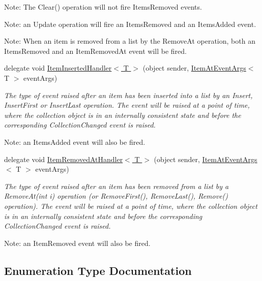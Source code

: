 \begin{DoxyCompactItemize}
\begin{DoxyCompactList}
Note\+: The Clear() operation will not fire Items\+Removed events. 

Note\+: an Update operation will fire an Items\+Removed and an Items\+Added event. 

Note\+: When an item is removed from a list by the Remove\+At operation, both an Items\+Removed and an Item\+Removed\+At event will be fired. \end{DoxyCompactList}\item 
delegate void \hyperlink{namespace_c5_a969e97103fb42e478a9c9cedba5a31fa}{Item\+Inserted\+Handler$<$ T $>$} (object sender, \hyperlink{class_c5_1_1_item_at_event_args}{Item\+At\+Event\+Args}$<$ T $>$ event\+Args)
\begin{DoxyCompactList}\small\item\em The type of event raised after an item has been inserted into a list by an Insert, Insert\+First or Insert\+Last operation. The event will be raised at a point of time, where the collection object is in an internally consistent state and before the corresponding Collection\+Changed event is raised. 

Note\+: an Items\+Added event will also be fired. \end{DoxyCompactList}\item 
delegate void \hyperlink{namespace_c5_adf46e8dc9cb56a1eac2fad63016c18d0}{Item\+Removed\+At\+Handler$<$ T $>$} (object sender, \hyperlink{class_c5_1_1_item_at_event_args}{Item\+At\+Event\+Args}$<$ T $>$ event\+Args)
\begin{DoxyCompactList}\small\item\em The type of event raised after an item has been removed from a list by a Remove\+At(int i) operation (or Remove\+First(), Remove\+Last(), Remove() operation). The event will be raised at a point of time, where the collection object is in an internally consistent state and before the corresponding Collection\+Changed event is raised. 

Note\+: an Item\+Removed event will also be fired. \end{DoxyCompactList}\end{DoxyCompactItemize}


\subsection{Enumeration Type Documentation}
\hypertarget{namespace_c5_aad282676794e49130eb8caed289395f8}{}
